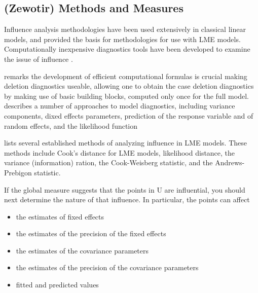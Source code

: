 \documentclass[12pt, a4paper]{report}
\theoremstyle{plain}
\theoremstyle{definition}
\theoremstyle{remark}
\begin{document}



\subsection{(Zewotir) Methods and Measures}
Influence analysis methodologies have been used extensively in classical linear models, and provided the basis for methodologies for use with LME models. Computationally inexpensive diagnostics tools have been developed to examine the issue of influence \citep{Zewotir}. 


\citet{Zewotir} remarks the development of efficient computational formulas is crucial making deletion diagnostics useable, allowing one to obtain the  case deletion diagnostics by making use of basic building blocks, computed only once for the full model. \citet{Zewotir} describes a number of approaches to model diagnostics, including variance components, dixed effects parameters, prediction of the response variable and of random effects, and the likelihood function

\citet{Zewotir} lists several established methods of analyzing influence in LME models. These methods include Cook's distance for LME models,
 likelihood distance,
the variance (information) ration,
the  Cook-Weisberg statistic, and
the  Andrews-Prebigon statistic.

If the global measure suggests that the points in U are influential, you should next determine the nature of
that influence. In particular, the points can affect
\begin{itemize}
	\item the estimates of fixed effects
	\item the estimates of the precision of the fixed effects
	\item the estimates of the covariance parameters
	\item the estimates of the precision of the covariance parameters
	\item fitted and predicted values
\end{itemize}	
\end{document}
